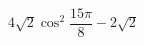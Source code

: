 \begin{ex}[type=expression]
	\begin{condition}
		\( 4\sqrt{2}\cos^2\dfrac{15\pi}{8}-2\sqrt{2} \)
	\end{condition}
\end{ex}
